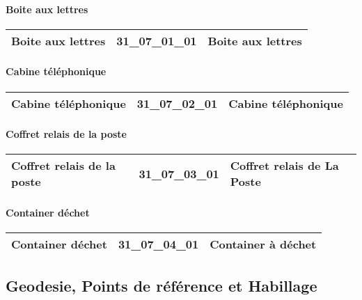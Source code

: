 \documentclass[12pt,titlepage]{book}
\begin{document}
\paragraph{Boite aux lettres}
\noindent
\vspace{\baselineskip}

\renewcommand{\arraystretch}{1.2}
\begin{supertabular}{|p{10cm}|c|p{15cm}|}
 Boite aux lettres & 31\_07\_01\_01 & Boite aux lettres\\
\hline
\end{supertabular}


\paragraph{Cabine téléphonique}
\noindent
\vspace{\baselineskip}

\renewcommand{\arraystretch}{1.2}
\begin{supertabular}{|p{10cm}|c|p{15cm}|}
 Cabine téléphonique & 31\_07\_02\_01 & Cabine téléphonique\\
\hline
\end{supertabular}


\paragraph{Coffret relais de la poste}
\noindent
\vspace{\baselineskip}

\renewcommand{\arraystretch}{1.2}
\begin{supertabular}{|p{10cm}|c|p{15cm}|}
 Coffret relais de la poste & 31\_07\_03\_01 & Coffret relais de La Poste\\
\hline
\end{supertabular}


\paragraph{Container déchet}
\noindent
\vspace{\baselineskip}

\renewcommand{\arraystretch}{1.2}
\begin{supertabular}{|p{10cm}|c|p{15cm}|}
 Container déchet & 31\_07\_04\_01 & Container à déchet\\
\hline
\end{supertabular}
\subsection{Geodesie, Points de référence et Habillage}
\end{document}
